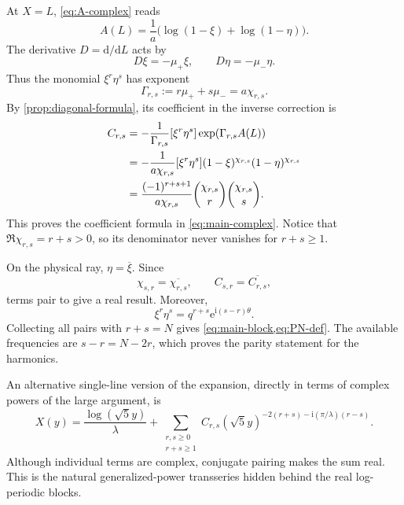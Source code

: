 \documentclass[11pt,oneside]{article}
\numberwithin{equation}{section}
\newcommand{\e}{\mathrm{e}}
\newcommand{\ii}{\mathrm{i}}
\newcommand{\dd}{\mathrm{d}}
\newcommand{\coeff}[2]{[#1]#2}
\begin{document}
At \(X=L\), \cref{eq:A-complex} reads
\begin{equation}
  A(L)=\frac1a\bigl(\log(1-\xi)+\log(1-\eta)\bigr).
  \label{eq:A-at-L}
\end{equation}
The derivative \(D=\dd/\dd L\) acts by
\begin{equation}
  D\xi=-\mu_+\xi,
  \qquad
  D\eta=-\mu_-\eta.
  \label{eq:D-xi-eta}
\end{equation}
Thus the monomial \(\xi^r\eta^s\) has exponent
\begin{equation}
  \Gamma_{r,s}:=r\mu_++s\mu_-=a\chi_{r,s}.
  \label{eq:Gamma-rs}
\end{equation}
By \cref{prop:diagonal-formula}, its coefficient in the inverse correction is
\begin{align}
  C_{r,s}
  &=-\frac1{\Gamma_{r,s}}
    \coeff{\xi^r\eta^s}{\exp\!\left(\Gamma_{r,s}A(L)\right)}
  \notag\\
  &=-\frac1{a\chi_{r,s}}
    \coeff{\xi^r\eta^s}{(1-\xi)^{\chi_{r,s}}
                                  (1-\eta)^{\chi_{r,s}}}
  \notag\\
  &=\frac{(-1)^{r+s+1}}{a\chi_{r,s}}
    \binom{\chi_{r,s}}r\binom{\chi_{r,s}}s.
  \label{eq:C-derivation}
\end{align}
This proves the coefficient formula in \cref{eq:main-complex}.  Notice that
\(\Re\chi_{r,s}=r+s>0\), so its denominator never vanishes for
\(r+s\ge1\).

On the physical ray, \(\eta=\overline\xi\).  Since
\begin{equation}
  \chi_{s,r}=\overline{\chi_{r,s}},
  \qquad
  C_{s,r}=\overline{C_{r,s}},
  \label{eq:conjugate-coefficients}
\end{equation}
terms pair to give a real result.  Moreover,
\begin{equation}
  \xi^r\eta^s=q^{r+s}\e^{\ii(s-r)\theta}.
  \label{eq:monomial-block}
\end{equation}
Collecting all pairs with \(r+s=N\) gives \cref{eq:main-block,eq:PN-def}.
The available frequencies are \(s-r=N-2r\), which proves the parity statement
for the harmonics.

An alternative single-line version of the expansion, directly in terms of
complex powers of the large argument, is
\begin{equation}
  X(y)=\frac{\log(\sqrt5y)}\lambda
  +\sum_{\substack{r,s\ge0\\r+s\ge1}}
  C_{r,s}(\sqrt5y)^{-2(r+s)-\ii(\pi/\lambda)(r-s)}.
  \label{eq:complex-power-version}
\end{equation}
Although individual terms are complex, conjugate pairing makes the sum real.
This is the natural generalized-power transseries hidden behind the real
log-periodic blocks.
\end{document}
